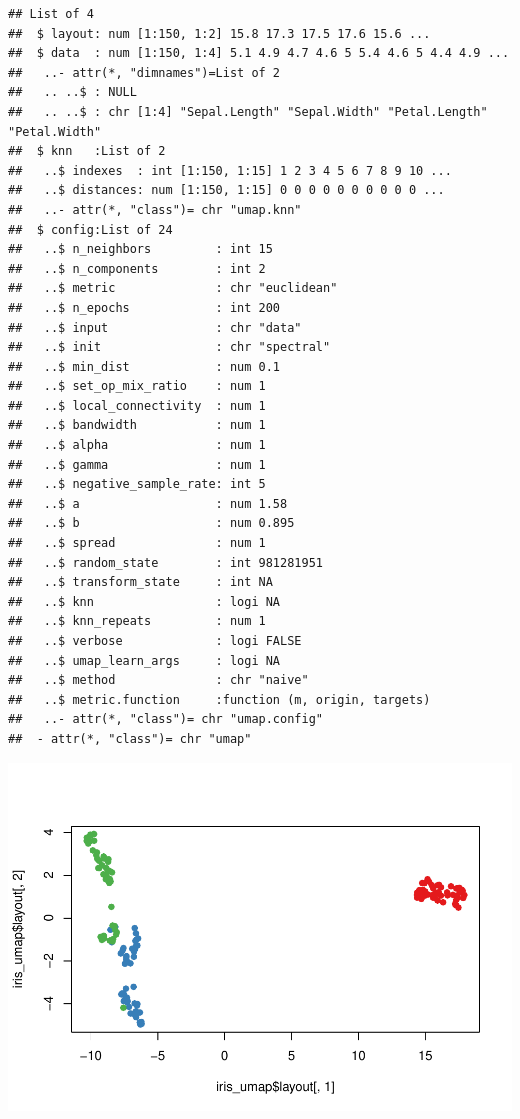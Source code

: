 \documentclass[
]{book}
\newenvironment{Shaded}{\begin{snugshade}}{\end{snugshade}}
\newcommand{\AttributeTok}[1]{\textcolor[rgb]{0.13,0.29,0.53}{#1}}
\newcommand{\DecValTok}[1]{\textcolor[rgb]{0.00,0.00,0.81}{#1}}
\newcommand{\FunctionTok}[1]{\textcolor[rgb]{0.13,0.29,0.53}{\textbf{#1}}}
\newcommand{\NormalTok}[1]{#1}
\newcommand{\SpecialCharTok}[1]{\textcolor[rgb]{0.81,0.36,0.00}{\textbf{#1}}}
\begin{document}
\begin{verbatim}
## List of 4
##  $ layout: num [1:150, 1:2] 15.8 17.3 17.5 17.6 15.6 ...
##  $ data  : num [1:150, 1:4] 5.1 4.9 4.7 4.6 5 5.4 4.6 5 4.4 4.9 ...
##   ..- attr(*, "dimnames")=List of 2
##   .. ..$ : NULL
##   .. ..$ : chr [1:4] "Sepal.Length" "Sepal.Width" "Petal.Length" "Petal.Width"
##  $ knn   :List of 2
##   ..$ indexes  : int [1:150, 1:15] 1 2 3 4 5 6 7 8 9 10 ...
##   ..$ distances: num [1:150, 1:15] 0 0 0 0 0 0 0 0 0 0 ...
##   ..- attr(*, "class")= chr "umap.knn"
##  $ config:List of 24
##   ..$ n_neighbors         : int 15
##   ..$ n_components        : int 2
##   ..$ metric              : chr "euclidean"
##   ..$ n_epochs            : int 200
##   ..$ input               : chr "data"
##   ..$ init                : chr "spectral"
##   ..$ min_dist            : num 0.1
##   ..$ set_op_mix_ratio    : num 1
##   ..$ local_connectivity  : num 1
##   ..$ bandwidth           : num 1
##   ..$ alpha               : num 1
##   ..$ gamma               : num 1
##   ..$ negative_sample_rate: int 5
##   ..$ a                   : num 1.58
##   ..$ b                   : num 0.895
##   ..$ spread              : num 1
##   ..$ random_state        : int 981281951
##   ..$ transform_state     : int NA
##   ..$ knn                 : logi NA
##   ..$ knn_repeats         : num 1
##   ..$ verbose             : logi FALSE
##   ..$ umap_learn_args     : logi NA
##   ..$ method              : chr "naive"
##   ..$ metric.function     :function (m, origin, targets)  
##   ..- attr(*, "class")= chr "umap.config"
##  - attr(*, "class")= chr "umap"
\end{verbatim}

\begin{Shaded}
\end{Shaded}

\includegraphics{_main_files/figure-latex/unnamed-chunk-56-1.pdf}
\end{document}
